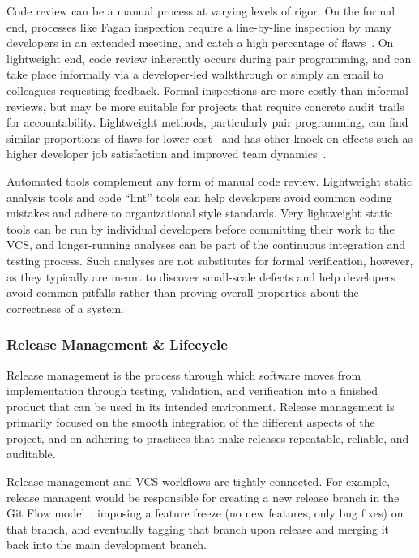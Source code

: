 Code review can be a manual process at varying levels of rigor. On the
formal end, processes like Fagan inspection require a line-by-line
inspection by many developers in an extended meeting, and catch a high
percentage of flaws~\cite{fagan2002design}. On lightweight end, code
review inherently occurs during pair programming, and can take place
informally via a developer-led walkthrough or simply an email to
colleagues requesting feedback. Formal inspections are more costly
than informal reviews, but may be more suitable for projects that
require concrete audit trails for accountability. Lightweight methods,
particularly pair programming, can find similar proportions of flaws
for lower cost~\cite{tomayko2002comparison} and has other knock-on
effects such as higher developer job satisfaction and improved team
dynamics~\cite{cockburn2000costs}.

Automated tools complement any form of manual code review. Lightweight
static analysis tools and code ``lint'' tools can help developers
avoid common coding mistakes and adhere to organizational style
standards. Very lightweight static tools can be run by individual
developers before committing their work to the VCS, and longer-running
analyses can be part of the continuous integration and testing
process. Such analyses are not substitutes for formal verification,
however, as they typically are meant to discover small-scale defects
and help developers avoid common pitfalls rather than proving overall
properties about the correctness of a system.

\subsubsection{Release Management \& Lifecycle}

Release management is the process through which software moves from
implementation through testing, validation, and verification into a
finished product that can be used in its intended environment. Release
management is primarily focused on the smooth integration of the
different aspects of the project, and on adhering to practices that
make releases repeatable, reliable, and auditable.

Release management and VCS workflows are tightly connected. For
example, release managent would be responsible for creating a new
release branch in the Git Flow model~\cite{atlassianworkflow},
imposing a feature freeze (no new features, only bug fixes) on that
branch, and eventually tagging that branch upon release and merging it
back into the main development branch.

